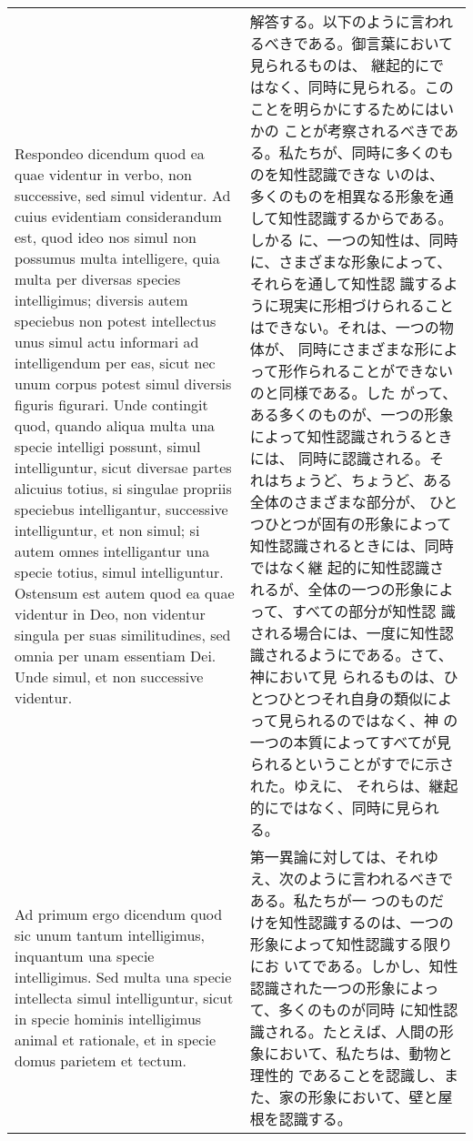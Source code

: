 \documentclass[10pt]{jsarticle} %
\begin{document}
\begin{longtable}{p{21em}p{21em}}
{\sc  Respondeo dicendum} quod ea quae videntur in verbo, non
 successive, sed simul videntur. Ad cuius evidentiam considerandum est,
 quod ideo nos simul non possumus multa intelligere, quia multa per
 diversas species intelligimus; diversis autem speciebus non potest
 intellectus unus simul actu informari ad intelligendum per eas, sicut
 nec unum corpus potest simul diversis figuris figurari. Unde contingit
 quod, quando aliqua multa una specie intelligi possunt, simul
 intelliguntur, sicut diversae partes alicuius totius, si singulae
 propriis speciebus intelligantur, successive intelliguntur, et non
 simul; si autem omnes intelligantur una specie totius, simul
 intelliguntur. Ostensum est autem quod ea quae videntur in Deo, non
 videntur singula per suas similitudines, sed omnia per unam essentiam
 Dei. Unde simul, et non successive videntur.


&

解答する。以下のように言われるべきである。御言葉において見られるものは、
継起的にではなく、同時に見られる。このことを明らかにするためにはいかの
ことが考察されるべきである。私たちが、同時に多くのものを知性認識できな
いのは、多くのものを相異なる形象を通して知性認識するからである。しかる
に、一つの知性は、同時に、さまざまな形象によって、それらを通して知性認
識するように現実に形相づけられることはできない。それは、一つの物体が、
同時にさまざまな形によって形作られることができないのと同様である。した
がって、ある多くのものが、一つの形象によって知性認識されうるときには、
同時に認識される。それはちょうど、ちょうど、ある全体のさまざまな部分が、
ひとつひとつが固有の形象によって知性認識されるときには、同時ではなく継
起的に知性認識されるが、全体の一つの形象によって、すべての部分が知性認
識される場合には、一度に知性認識されるようにである。さて、神において見
られるものは、ひとつひとつそれ自身の類似によって見られるのではなく、神
の一つの本質によってすべてが見られるということがすでに示された。ゆえに、
それらは、継起的にではなく、同時に見られる。


\\



{\sc Ad primum ergo dicendum} quod sic unum tantum intelligimus,
inquantum una specie intelligimus. Sed multa una specie intellecta
simul intelliguntur, sicut in specie hominis intelligimus animal et
rationale, et in specie domus parietem et tectum.


&

第一異論に対しては、それゆえ、次のように言われるべきである。私たちが一
つのものだけを知性認識するのは、一つの形象によって知性認識する限りにお
いてである。しかし、知性認識された一つの形象によって、多くのものが同時
に知性認識される。たとえば、人間の形象において、私たちは、動物と理性的
であることを認識し、また、家の形象において、壁と屋根を認識する。



\end{longtable}
\end{document}

